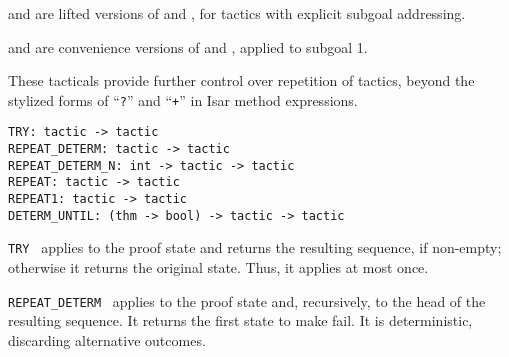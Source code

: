 \begin{isabellebody}
\begin{isamarkuptext}
\begin{description}
  \item {} and  are lifted versions of
   and , for tactics with explicit
  subgoal addressing.

  \item {} and  are convenience versions
  of  and , applied to subgoal 1.

  \end{description}%
\end{isamarkuptext}%
\isamarkuptrue%
%
\endisatagmlref
{\isafoldmlref}%
%
\isadelimmlref
%
\endisadelimmlref
%
\isamarkuptrue%
%
\begin{isamarkuptext}%
These tacticals provide further control over repetition of
  tactics, beyond the stylized forms of ``\verb|?|''  and
  ``\verb|+|'' in Isar method expressions.%
\end{isamarkuptext}%
\isamarkuptrue%
%
\isadelimmlref
%
\endisadelimmlref
%
\isatagmlref
%
\begin{isamarkuptext}%
\begin{mldecls}
  \verb|TRY: tactic -> tactic| \\
  \verb|REPEAT_DETERM: tactic -> tactic| \\
  \verb|REPEAT_DETERM_N: int -> tactic -> tactic| \\
  \verb|REPEAT: tactic -> tactic| \\
  \verb|REPEAT1: tactic -> tactic| \\
  \verb|DETERM_UNTIL: (thm -> bool) -> tactic -> tactic| \\
  \end{mldecls}

  \begin{description}

  \item \verb|TRY|~ applies  to the proof
  state and returns the resulting sequence, if non-empty; otherwise it
  returns the original state.  Thus, it applies  at most
  once.

  \item \verb|REPEAT_DETERM|~ applies  to the
  proof state and, recursively, to the head of the resulting sequence.
  It returns the first state to make  fail.  It is
  deterministic, discarding alternative outcomes.


\end{description}
\end{isamarkuptext}
\end{isabellebody}

